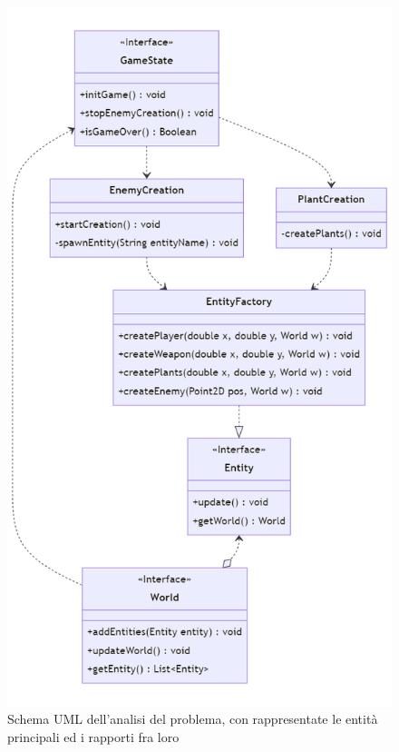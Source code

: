 \documentclass[a4paper,12pt]{report}
\begin{document}
\begin{figure}[H]
\centering{}
\includegraphics[width=\textwidth,height=0.8\textheight,keepaspectratio]{img/AnalysisUML.png}
\caption{Schema UML dell'analisi del problema, con rappresentate le entità principali ed i rapporti fra loro}
\label{img:analysisScheme}
\end{figure}

\end{document}
